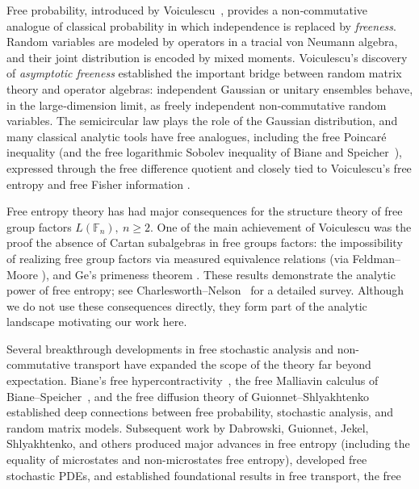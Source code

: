 \documentclass[10pt,a4paper,reqno]{amsart}
\begin{document}
Free probability, introduced by Voiculescu~\cite{Voic1,Voic2,Voic3,V,V6}, provides a non‑commutative analogue of classical probability in which independence is replaced by \emph{freeness}.  Random variables are modeled by operators in a tracial von Neumann algebra, and their joint distribution is encoded by mixed moments.  Voiculescu’s discovery of \emph{asymptotic freeness} \cite{Voiculescu1991,Voiculescu1992} established the important bridge between random matrix theory and operator algebras: independent Gaussian or unitary ensembles behave, in the large‑dimension limit, as freely independent non‑commutative random variables.  The semicircular law plays the role of the Gaussian distribution, and many classical analytic tools have free analogues, including the free Poincaré inequality \cite{Voipub,Dab10} (and the free logarithmic Sobolev inequality of Biane and Speicher~\cite{BS2,BLS}), expressed through the free difference quotient and closely tied to Voiculescu’s free entropy and free Fisher information \cite{Voic2,V,V6,VF}.
\par\vspace{0.5em}
Free entropy theory has had major consequences for the structure theory of free group factors $L(\mathbb{F}_n),\:n\geq2$.  One of the main achievement of Voiculescu was the proof the absence of Cartan subalgebras \cite{Voic2} in free groups factors: the impossibility of realizing free group factors via measured equivalence relations (via Feldman--Moore \cite{FeldmanMoore}), and Ge’s primeness theorem \cite{Ge}.  These results demonstrate the analytic power of free entropy; see Charlesworth--Nelson~\cite{CN} for a detailed survey.  Although we do not use these consequences directly, they form part of the analytic landscape motivating our work here.
\par\vspace{0.5em}
Several breakthrough developments in free stochastic analysis and non\mbox{-}commutative
transport have expanded the scope of the theory far beyond expectation.  Biane’s free
hypercontractivity~\cite{Biane}, the free Malliavin calculus of Biane--Speicher~\cite{BS},
and the free diffusion theory of Guionnet--Shlyakhtenko~\cite{GS,GS2} established deep
connections between free probability, stochastic analysis, and random matrix models.
Subsequent work by Dabrowski, Guionnet, Jekel, Shlyakhtenko, and others
\cite{DAB,Dab14,YGS,Jek1,Jek2,Jek3,Jek4,Jek5} produced major advances in free entropy
(including the equality of microstates and non\mbox{-}microstates free entropy), developed
free stochastic PDEs, and established foundational results in free transport, the free
\end{document}
